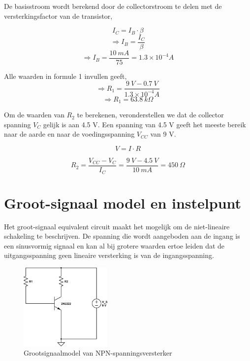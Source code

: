 \documentclass{article}
\begin{document}
\noindent De basisstroom wordt berekend door de collectorstroom te delen met de versterkingsfactor van de transistor,

\begin{equation}
I_C=I_B \cdot \beta
\end{equation}
$$\Rightarrow I_B=\frac{I_C}{\beta}$$
$$\Rightarrow I_B=\frac{10 \: mA}{75}=1.3\times 10^{-4}A$$

\noindent Alle waarden in formule 1 invullen geeft,
$$\Rightarrow R_1=\frac{9\: V-0.7\: V}{1.3\times 10^{-4}A}$$
$$\Rightarrow R_1=63.8 \: k  \Omega$$

\noindent Om de waarden van $R_2$ te berekenen, veronderstellen we dat de collector spanning $V_C$ gelijk is aan 4.5 V. Een spanning van 4.5 V geeft het meeste bereik naar de aarde en naar de voedingsspanning $V_{CC}$ van 9 V. 

\begin{equation}
V = I \cdot R 
\end{equation}

$$R_2 = \frac{V_{CC}-V_C}{I_C} = \frac{9\:V-4.5\:V}{10\:mA}=450\: \Omega$$

\section*{Groot-signaal model en instelpunt}

Het groot-signaal equivalent circuit maakt het mogelijk om de niet-lineaire schakeling te beschrijven. De spanning die wordt aangeboden aan de ingang is een sinusvormig signaal en kan al bij grotere waarden ertoe leiden dat de uitgangsspanning geen lineaire versterking is van de ingangsspanning.

\begin{figure}[H]
	\centering
	\label{fig:npn-amplifier-grootsignaal}
	\includegraphics[width=0.4\textwidth]{resource/npn-grootsignaal-versterker}
	\caption{Grootsignaalmodel van NPN-spanningsversterker}
\end{figure}
\end{document}
